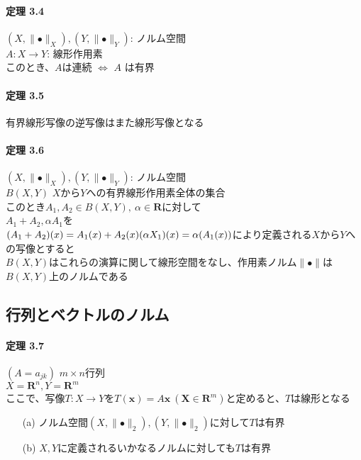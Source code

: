 \documentclass[12pt,a4paper]{article}
\begin{document}
    \paragraph{定理 3.4}
      $(X, \parallel \bullet\parallel_X), (Y, \parallel \bullet\parallel_Y)$: ノルム空間 \\
      $A : X \rightarrow Y$: 線形作用素 \\
      このとき、$A$は連続 $\Leftrightarrow$ $A$ は有界

    \paragraph{定理 3.5}
      有界線形写像の逆写像はまた線形写像となる

    \paragraph{定理 3.6}
      $(X, \parallel\bullet\parallel_X), (Y, \parallel\bullet\parallel_Y)$: ノルム空間 \\
      $B(X, Y)$ $X$から$Y$への有界線形作用素全体の集合 \\
      このとき$A_1, A_2 \in B(X, Y), \ \alpha \in \mathbf{R}$に対して \\
      $A_1 + A_2, \alpha A_1$を \\
      $(A_1 + A_2) (x) = A_1 (x) + A_2 (x) \\
      (\alpha X_1)(x) = \alpha (A_1 (x)) $により定義される$X$から$Y$への写像とすると \\
      $B(X, Y)$はこれらの演算に関して線形空間をなし、作用素ノルム$\parallel\bullet\parallel$は$B(X, Y)$上のノルムである

  \subsection{行列とベクトルのノルム}
    \paragraph{定理 3.7}
    $(A=a_{jk})$ $m\times n$行列 \\
    $X = \mathbf{R}^n, Y= \mathbf{R}^m$ \\
    ここで、写像$T : X \rightarrow Y$を$T(\mathbf{x}) = A \mathbf{x} \ (\mathbf{X} \in \mathbf{R}^m)$と定めると、$T$は線形となる \\

    \begin{itemize}
      \item[(a)] ノルム空間$(X, \parallel\bullet\parallel_2), (Y, \parallel\bullet\parallel_2)$に対して$T$は有界
      \item[(b)] $X, Y$に定義されるいかなるノルムに対しても$T$は有界
    \end{itemize}
\end{document}
